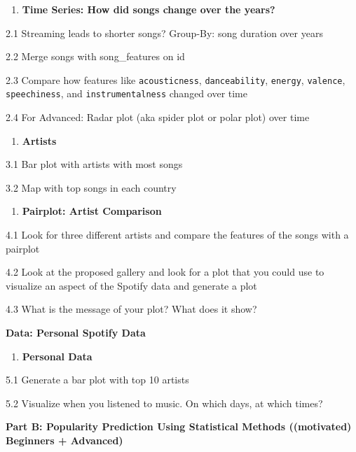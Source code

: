 \documentclass[
  11pt,
]{book}
\providecommand{\tightlist}{%
  \setlength{\itemsep}{0pt}\setlength{\parskip}{0pt}}
\begin{document}
\begin{enumerate}
\def\labelenumi{\arabic{enumi}.}
\setcounter{enumi}{1}
\tightlist
\item
  \textbf{Time Series: How did songs change over the years?}
\end{enumerate}

2.1 Streaming leads to shorter songs? Group-By: song duration over years

2.2 Merge songs with song\_features on id

2.3 Compare how features like \texttt{acousticness}, \texttt{danceability}, \texttt{energy}, \texttt{valence}, \texttt{speechiness}, and \texttt{instrumentalness} changed over time

2.4 For Advanced: Radar plot (aka spider plot or polar plot) over time

\begin{enumerate}
\def\labelenumi{\arabic{enumi}.}
\setcounter{enumi}{2}
\tightlist
\item
  \textbf{Artists}
\end{enumerate}

3.1 Bar plot with artists with most songs

3.2 Map with top songs in each country

\begin{enumerate}
\def\labelenumi{\arabic{enumi}.}
\setcounter{enumi}{3}
\tightlist
\item
  \textbf{Pairplot: Artist Comparison}
\end{enumerate}

4.1 Look for three different artists and compare the features of the songs with a pairplot

4.2 Look at the proposed gallery and look for a plot that you could use to visualize an aspect of the Spotify data and generate a plot

4.3 What is the message of your plot? What does it show?

\textbf{Data: Personal Spotify Data}

\begin{enumerate}
\def\labelenumi{\arabic{enumi}.}
\setcounter{enumi}{4}
\tightlist
\item
  \textbf{Personal Data}
\end{enumerate}

5.1 Generate a bar plot with top 10 artists

5.2 Visualize when you listened to music. On which days, at which times?

\textbf{Part B: Popularity Prediction Using Statistical Methods ((motivated) Beginners + Advanced)}
\end{document}
